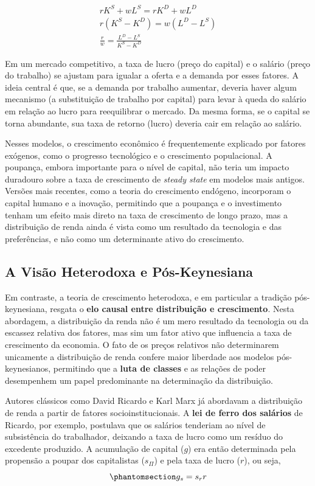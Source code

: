 \documentclass[
  brazilian,
  letterpaper,
  DIV=11,
  numbers=noendperiod]{scrreprt}
\begin{document}
\[
\begin{aligned}
rK^S + wL^S = rK^D + w L^D\\
r (K^S - K^D) = w (L^D - L^S)\\
\frac{r}{w} = \frac{L^D - L^S}{K^S - K^D}
\end{aligned}
\]

Em um mercado competitivo, a taxa de lucro (preço do capital) e o
salário (preço do trabalho) se ajustam para igualar a oferta e a demanda
por esses fatores. A ideia central é que, se a demanda por trabalho
aumentar, deveria haver algum mecanismo (a substituição de trabalho por
capital) para levar à queda do salário em relação ao lucro para
reequilibrar o mercado. Da mesma forma, se o capital se torna abundante,
sua taxa de retorno (lucro) deveria cair em relação ao salário.

Nesses modelos, o crescimento econômico é frequentemente explicado por
fatores exógenos, como o progresso tecnológico e o crescimento
populacional. A poupança, embora importante para o nível de capital, não
teria um impacto duradouro sobre a taxa de crescimento de \emph{steady
state} em modelos mais antigos. Versões mais recentes, como a teoria do
crescimento endógeno, incorporam o capital humano e a inovação,
permitindo que a poupança e o investimento tenham um efeito mais direto
na taxa de crescimento de longo prazo, mas a distribuição de renda ainda
é vista como um resultado da tecnologia e das preferências, e não como
um determinante ativo do crescimento.

\subsection{A Visão Heterodoxa e
Pós-Keynesiana}\label{a-visuxe3o-heterodoxa-e-puxf3s-keynesiana}

Em contraste, a teoria de crescimento heterodoxa, e em particular a
tradição pós-keynesiana, resgata o \textbf{elo causal entre distribuição
e crescimento}. Nesta abordagem, a distribuição da renda não é um mero
resultado da tecnologia ou da escassez relativa dos fatores, mas sim um
fator ativo que influencia a taxa de crescimento da economia. O fato de
os preços relativos não determinarem unicamente a distribuição de renda
confere maior liberdade aos modelos pós-keynesianos, permitindo que a
\textbf{luta de classes} e as relações de poder desempenhem um papel
predominante na determinação da distribuição.

Autores clássicos como David Ricardo e Karl Marx já abordavam a
distribuição de renda a partir de fatores socioinstitucionais. A
\textbf{lei de ferro dos salários} de Ricardo, por exemplo, postulava
que os salários tenderiam ao nível de subsistência do trabalhador,
deixando a taxa de lucro como um resíduo do excedente produzido. A
acumulação de capital (\(g\)) era então determinada pela propensão a
poupar dos capitalistas (\(s_\Pi\)) e pela taxa de lucro (\(r\)), ou
seja,
\begin{equation}\protect\phantomsection\label{eq-gs}{g_s = s_r r}\end{equation}
\end{document}
